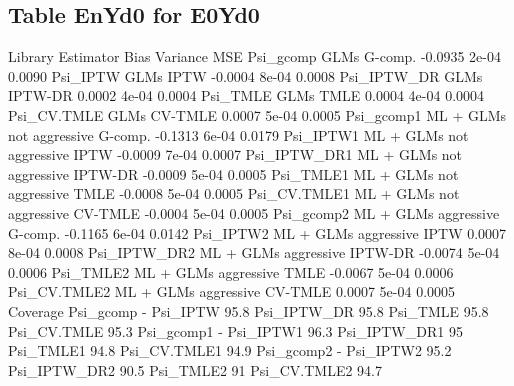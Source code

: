\documentclass[11pt]{article}
\begin{document}
\subsection{Table EnYd0 for E0Yd0}
\begin{Schunk}
\begin{Soutput}
                              Library Estimator    Bias Variance    MSE
Psi_gcomp                        GLMs   G-comp. -0.0935    2e-04 0.0090
Psi_IPTW                         GLMs      IPTW -0.0004    8e-04 0.0008
Psi_IPTW_DR                      GLMs   IPTW-DR  0.0002    4e-04 0.0004
Psi_TMLE                         GLMs      TMLE  0.0004    4e-04 0.0004
Psi_CV.TMLE                      GLMs   CV-TMLE  0.0007    5e-04 0.0005
Psi_gcomp1   ML + GLMs not aggressive   G-comp. -0.1313    6e-04 0.0179
Psi_IPTW1    ML + GLMs not aggressive      IPTW -0.0009    7e-04 0.0007
Psi_IPTW_DR1 ML + GLMs not aggressive   IPTW-DR -0.0009    5e-04 0.0005
Psi_TMLE1    ML + GLMs not aggressive      TMLE -0.0008    5e-04 0.0005
Psi_CV.TMLE1 ML + GLMs not aggressive   CV-TMLE -0.0004    5e-04 0.0005
Psi_gcomp2       ML + GLMs aggressive   G-comp. -0.1165    6e-04 0.0142
Psi_IPTW2        ML + GLMs aggressive      IPTW  0.0007    8e-04 0.0008
Psi_IPTW_DR2     ML + GLMs aggressive   IPTW-DR -0.0074    5e-04 0.0006
Psi_TMLE2        ML + GLMs aggressive      TMLE -0.0067    5e-04 0.0006
Psi_CV.TMLE2     ML + GLMs aggressive   CV-TMLE  0.0007    5e-04 0.0005
             Coverage
Psi_gcomp           -
Psi_IPTW        95.8%
Psi_IPTW_DR     95.8%
Psi_TMLE        95.8%
Psi_CV.TMLE     95.3%
Psi_gcomp1          -
Psi_IPTW1       96.3%
Psi_IPTW_DR1      95%
Psi_TMLE1       94.8%
Psi_CV.TMLE1    94.9%
Psi_gcomp2          -
Psi_IPTW2       95.2%
Psi_IPTW_DR2    90.5%
Psi_TMLE2         91%
Psi_CV.TMLE2    94.7%
\end{Soutput}
\end{Schunk}
\end{document}
